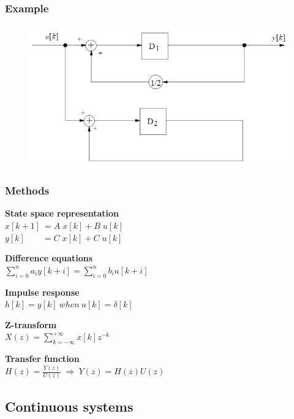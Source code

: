 \documentclass{beamer}
\begin{document}

\begin{frame}
\frametitle{Example}
\begin{figure}
\includegraphics[width=1\linewidth]{discrete_system}
\end{figure}

\end{frame}


\begin{frame}
\frametitle{Methods}
\textbf{State space representation}\\
$x[k+1] \> = A\; x[k] + B\; u[k]$ \\
$y[k]\qquad = C\; x[k] + C\; u[k]$
\bigskip

\textbf{Difference equations}\\
$\sum\limits_{i=0}^n a_{i}y[k+i] = \sum \limits_{i=0}^n b_{i}u[k+i]$
\bigskip

\textbf{Impulse response}\\
$h[k] = y[k] \> when \> u[k] = \delta[k]$\\
\bigskip

\textbf{Z-transform}\\
$X(z) = \sum \limits_{k = -\infty}^{+\infty} x[k] z^{-k}$
\bigskip

\textbf{Transfer function}\\
$H(z) = \frac{Y(z)}{U(z)} \; \Rightarrow \> Y(z) = H(z)U(z)$

\end{frame}

\subsection{Continuous systems} 
\end{document}
